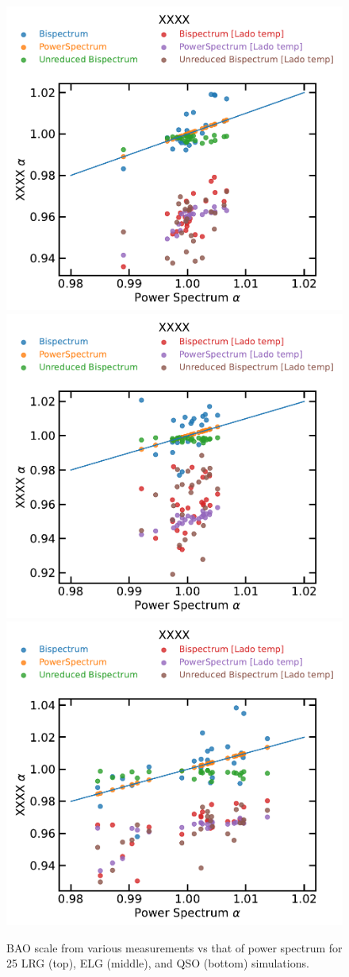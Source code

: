 \begin{figure}
    \centering
    \includegraphics[width=0.45 \textwidth]{figures/constraints_scatter_LRGz0.pdf}
    \includegraphics[width=0.45 \textwidth]{figures/constraints_scatter_ELGz1.pdf}
    \includegraphics[width=0.45 \textwidth]{figures/constraints_scatter_QSOz2.pdf}
    \caption{BAO scale from various measurements vs that of power spectrum for 25 LRG (top), ELG (middle), and QSO (bottom) simulations.}
    \label{fig:scatter_cons}
\end{figure}